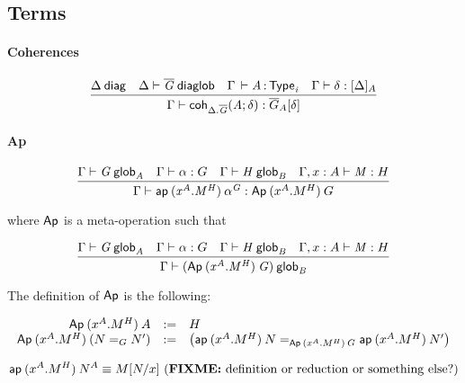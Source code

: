 \subsection{Terms}

\paragraph{Coherences}

\begin{small}
  \[
  \infer{\ofglob{\Gamma}{\coh{\ctx{\Delta}.\diag{G}}{A}{\delta}}
    {\interpglob{\diag{G}}{A}{\delta}}}
  {\wfdiag{\Delta}
    & \wfdiaglob{\Delta}{\diag G}
    & \oftp{\Gamma}{A}{\typ{i}}
    & \ofinterp{\Gamma}{\delta}{\Delta}{A}}
  \]
\end{small}

\paragraph{Ap}

\begin{small}
  \[\infer{\ofglob{\Gamma}{\ap{(x^A.M^H)}{\alpha^G}}
    {\Ap{(x^A.M^H)}{G}}}
  {\wfglob{\Gamma}{G}{n}{A}
    & \ofglob{\Gamma}{\alpha}{G}
    & \wfglob{\Gamma}{H}{m}{B}
    & \ofglob{\Gamma,x:A}{M}{H}}\]

  where $\dsd{Ap}$ is a meta-operation such that

  \[\infer{\wfglob{\Gamma}{(\Ap{(x^A.M^H)}{G})}{n+m}
    {B}}
  {\wfglob{\Gamma}{G}{n}{A}
    & \ofglob{\Gamma}{\alpha}{G}
    & \wfglob{\Gamma}{H}{m}{B}
    & \ofglob{\Gamma,x:A}{M}{H}}\]

  The definition of $\dsd{Ap}$ is the following:

  \[
  \begin{array}{rcl}
    \Ap{(x^A.M^H)}{A} & := & H \\
    \Ap{(x^A.M^H)}{(\homj{G}{N}{N'})} & := & \left(
      \homj{\Ap{(x^A.M^H)}{G}}
      {\ap{(x^A.M^H)}{N}}{\ap{(x^A.M^H)}{N'}}\right)
  \end{array}
  \]
\end{small}

\begin{small}
  \[
  \ap{(x^A.M^H)}{N^A}  \equiv  \subst{M}{N}{x}
  \text{ (\FIXME{definition or reduction or something else?})} \\ \\
  \]
\end{small}

